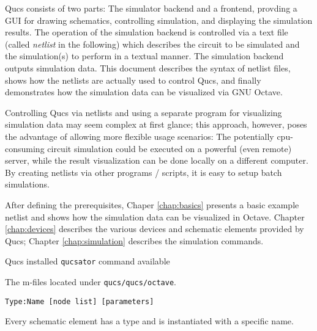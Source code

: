 %
%
%
%



Qucs consists of two parts: The simulator backend and a frontend, provding a GUI for drawing schematics, controlling simulation, and displaying the simulation results. The operation of the simulation backend is controlled via a text file (called \emph{netlist} in the following) which describes the circuit to be simulated and the simulation(s) to perform in a textual manner. The simulation backend outputs simulation data. This document describes the syntax of netlist files, shows how the netlists are actually used to control Qucs, and finally demonstrates how the simulation data can be visualized via GNU Octave.

Controlling Qucs via netlists and using a separate program for visualizing simulation data may seem complex at first glance; this approach, however, poses the advantage of allowing more flexible usage scenarios: The potentially cpu-consuming circuit simulation could be executed on a powerful (even remote) server, while the result visualization can be done locally on a different computer. By creating netlists via other programs / scripts, it is easy to setup batch simulations.



After defining the prerequisites, Chaper \ref{chap:basics} presents a basic example netlist and shows how the simulation data can be visualized in Octave. Chapter \ref{chap:devices} describes the various devices and schematic elements provided by Qucs; Chapter \ref{chap:simulation} describes the simulation commands.


\label{chap:basics}

Qucs installed \verb+qucsator+ command available

The m-files located under \verb+qucs/qucs/octave+.

\begin{verbatim}
Type:Name [node list] [parameters]
\end{verbatim}

Every schematic element has a type and is instantiated with a specific name.

